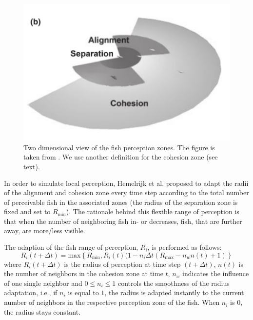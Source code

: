 \documentclass[11pt,a4paper]{article}
\begin{document}
\begin{figure}[H]
  \centering
  \includegraphics{perczones.pdf}
  \caption{Two dimensional view of the fish perception zones. The figure is taken from \cite{hemelrijk}. We use another definition for the cohesion zone (see text).}
  \label{fig:perczones}
\end{figure}

In order to simulate local perception, Hemelrijk et al. proposed to adapt the radii of the alignment and cohesion zone every time step according to the total number of perceivable fish in the associated zones (the radius of the separation zone is fixed and set to $R_{\text{min}}$). The rationale behind this flexible range of perception is that when the number of neighboring fish in- or decreases, fish, that are further away, are more/less visible. 

The adaption of the fish range of perception, $R_i$, is performed as follows:
\begin{equation}
R_i(t + \Delta t) = \text{max} \left\{ R_{\text{min}}, R_i(t)(1 - n_i \Delta t (R_{\text{max}} - n_w n(t) + 1) \right\}
\label{eq:R}
\end{equation}
where $R_i(t + \Delta t)$ is the radius of perception at time step $(t + \Delta t)$, $n(t)$ is the number of neighbors in the cohesion zone at time $t$, $n_w$ indicates the influence of one single neighbor and $0 \leq n_i \leq 1$ controls the smoothness of the radius adaptation, i.e., if $n_i$ is equal to $1$, the radius is adapted instantly to the current number of neighbors in the respective perception zone of the fish. When $n_i$ is $0$, the radius stays constant. 
\end{document}
